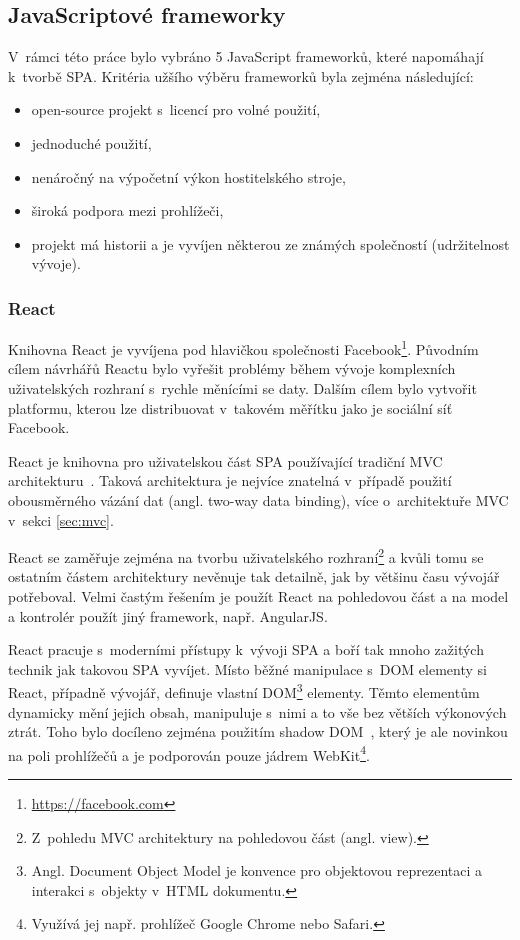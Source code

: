 \subsection{JavaScriptové frameworky}

V~rámci této práce bylo vybráno 5 JavaScript frameworků, které napomáhají k~tvorbě SPA. Kritéria užšího výběru frameworků byla zejména následující:

\begin{itemize}  
\item open-source projekt s~licencí pro volné použití,
\item jednoduché použití,
\item nenáročný na výpočetní výkon hostitelského stroje,
\item široká podpora mezi prohlížeči,
\item projekt má historii a je vyvíjen některou ze známých společností (udržitelnost vývoje).
\end{itemize}

\subsubsection*{React~\cite{react}}
Knihovna React je vyvíjena pod hlavičkou společnosti Facebook\footnote{\url{https://facebook.com}}. Původním cílem návrhářů Reactu bylo vyřešit problémy během vývoje komplexních uživatelských rozhraní s~rychle měnícími se daty. Dalším cílem bylo vytvořit platformu, kterou lze distribuovat v~takovém měřítku jako je sociální síť Facebook.

React je knihovna pro uživatelskou část SPA používající tradiční MVC architekturu~\cite{mvc}. Taková architektura je nejvíce znatelná v~případě použití obousměrného vázání dat (angl. two-way data binding), více o~architektuře MVC v~sekci \ref{sec:mvc}.

React se zaměřuje zejména na tvorbu uživatelského rozhraní\footnote{Z~pohledu MVC architektury na pohledovou část (angl. view).} a kvůli tomu se ostatním částem architektury nevěnuje tak detailně, jak by většinu času vývojář potřeboval. Velmi častým řešením je použít React na pohledovou část a na model a kontrolér použít jiný framework, např. AngularJS.

React pracuje s~moderními přístupy k~vývoji SPA a boří tak mnoho zažitých technik jak takovou SPA vyvíjet. Místo běžné manipulace s~DOM elementy si React, případně vývojář, definuje vlastní DOM\footnote{Angl. Document Object Model je konvence pro objektovou reprezentaci a interakci s~objekty v~HTML dokumentu.} elementy. Těmto elementům dynamicky mění jejich obsah, manipuluje s~nimi a to vše bez větších výkonových ztrát. Toho bylo docíleno zejména použitím shadow DOM~\cite{shadowdom}, který je ale novinkou na poli prohlížečů a je podporován pouze jádrem WebKit\footnote{Využívá jej např. prohlížeč Google Chrome nebo Safari.}. 

